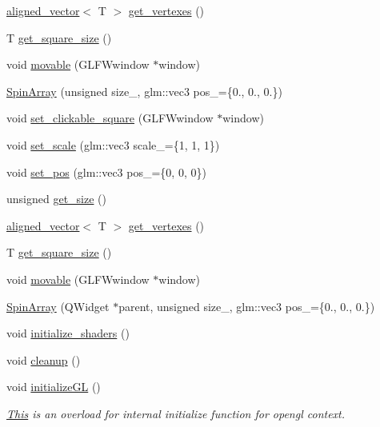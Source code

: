 \begin{DoxyCompactItemize}
\mbox{\hyperlink{type__definitions_8hpp_a087efd587d66b881646ef378f1919c90}{aligned\+\_\+vector}}$<$ T $>$ \mbox{\hyperlink{classSpinArray_ac4a17ebe80ae433662d69537adf9a4de}{get\+\_\+vertexes}} ()
\item 
T \mbox{\hyperlink{classSpinArray_adf314e4c6182e5344e8b793784576677}{get\+\_\+square\+\_\+size}} ()
\item 
void \mbox{\hyperlink{classSpinArray_ab2d41adf8269369e26c316684da70462}{movable}} (G\+L\+F\+Wwindow $\ast$window)
\item 
\mbox{\hyperlink{classSpinArray_ab18db2915e18885e5146eef092f4eb67}{Spin\+Array}} (unsigned size\+\_, glm\+::vec3 pos\+\_\+=\{0., 0., 0.\})
\item 
void \mbox{\hyperlink{classSpinArray_af60baac7f6d47c183ce395e909e8513f}{set\+\_\+clickable\+\_\+square}} (G\+L\+F\+Wwindow $\ast$window)
\item 
void \mbox{\hyperlink{classSpinArray_acc4dd3d5a680c195ebaea00120bd5ed8}{set\+\_\+scale}} (glm\+::vec3 scale\+\_\+=\{1, 1, 1\})
\item 
void \mbox{\hyperlink{classSpinArray_a904e68a8b76d7da16140a0352ae04dfa}{set\+\_\+pos}} (glm\+::vec3 pos\+\_\+=\{0, 0, 0\})
\item 
unsigned \mbox{\hyperlink{classSpinArray_ae7aa5d361c1f3024506291b04e027a7a}{get\+\_\+size}} ()
\item 
\mbox{\hyperlink{type__definitions_8hpp_a087efd587d66b881646ef378f1919c90}{aligned\+\_\+vector}}$<$ T $>$ \mbox{\hyperlink{classSpinArray_ac4a17ebe80ae433662d69537adf9a4de}{get\+\_\+vertexes}} ()
\item 
T \mbox{\hyperlink{classSpinArray_adf314e4c6182e5344e8b793784576677}{get\+\_\+square\+\_\+size}} ()
\item 
void \mbox{\hyperlink{classSpinArray_ab2d41adf8269369e26c316684da70462}{movable}} (G\+L\+F\+Wwindow $\ast$window)
\item 
\mbox{\hyperlink{classSpinArray_a05936858ffca26e37f98190dc8425976}{Spin\+Array}} (Q\+Widget $\ast$parent, unsigned size\+\_, glm\+::vec3 pos\+\_\+=\{0., 0., 0.\})
\item 
void \mbox{\hyperlink{classSpinArray_afb77bcbce445bec1e75efe2bd16bda31}{initialize\+\_\+shaders}} ()
\item 
void \mbox{\hyperlink{classSpinArray_a4ef3aa2bd3d5bdfe950a7eb8952b1eb8}{cleanup}} ()
\item 
void \mbox{\hyperlink{classSpinArray_a41d829fe76cf531a09c20f9a0b6ebf36}{initialize\+GL}} ()
\begin{DoxyCompactList}\small\item\em \mbox{\hyperlink{classThis}{This}} is an overload for internal initialize function for opengl context. \end{DoxyCompactList}\item 

\end{DoxyCompactItemize}
